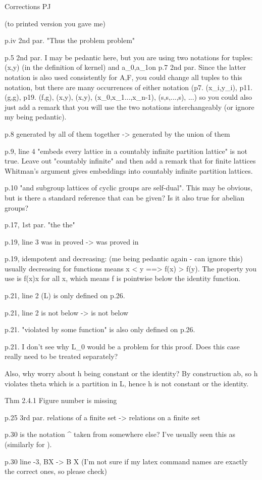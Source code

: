 Corrections PJ

(to printed version you gave me)

p.iv 2nd par. "Thus the problem problem"

p.5 2nd par. I may be pedantic here, but you are using two notations for tuples: (x,y)  (in the definition of kernel) and \langle a_0,a_1\langle on p.7 2nd par. Since the latter notation is also used consistently for \langle A,F\rangle, you could change all tuples to this notation, but there are many occurrences of either notation (p7. (x_i,y_i), p11. (g,g), p19. (f,g), (x,y), (x,y), (x_0,x_1...,x_{n-1}), (s,s,...,s), ...) so you could also just add a remark that you will use the two notations interchangeably (or ignore my being pedantic).

p.8 generated by all of them together -> generated by the union of them

p.9, line 4 "embeds every lattice in a countably infinite partition lattice"
is not true. Leave out "countably infinite" and then add a remark that for finite lattices Whitman's argument gives embeddings into countably infinite partition lattices.

p.10 "and subgroup lattices of cyclic groups are self-dual". This may be obvious, but is there a standard reference that can be given? Is it also true for abelian groups?

p.17, 1st par. "the the"

p.19, line 3 was in proved -> was proved in

p.19, idempotent and decreasing: (me being pedantic again - can ignore this) usually decreasing for functions means x < y ==> f(x) > f(y). The property you use is f(x)\le x for all x, which means f is pointwise below the identity function.

p.21, line 2 \lambda(L) is only defined on p.26.

p.21, line 2 \theta is not below \alpha -> \alpha is not below \theta

p.21. "violated by some function" is also only defined on p.26.

p.21. I don't see why L_0  would be a problem for this proof. Does this case really need to be treated separately? 

Also, why worry about h being constant or the identity? By construction a\ne b, so h violates theta which is a partition in L, hence h is not constant or the identity.

Thm 2.4.1 Figure number is missing

p.25 3rd par. relations of a finite set -> relations on a finite set

p.30 is the notation \alpha^{\downarrow} taken from somewhere else? I've usually seen this as {\downarrow}\alpha (similarly for \uparrow).

p.30 line -3, B\lessnotequal X -> B \subsetne X  (I'm not sure if my latex command names are exactly the correct ones, so please check)

